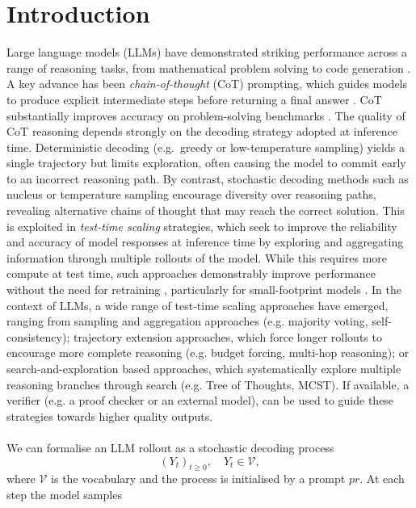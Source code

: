 \documentclass{article} %
\begin{document}
\section{Introduction}\label{sec:introduction}
Large language models (LLMs) have demonstrated striking performance across a range of reasoning tasks, from mathematical problem solving to code generation \citep{brown2020gpt3,openai2023gpt4}. 
A key advance has been \emph{chain-of-thought} (CoT) prompting, which guides models to produce explicit intermediate steps before returning a final answer \citep{wei2022cot,kojima2022zeroshot}. 
CoT substantially improves accuracy on problem-solving benchmarks \citep{cobbe2021gsm8k,lewkowycz2022minerva}. 
The quality of CoT reasoning depends strongly on the {decoding strategy} adopted at inference time.  Deterministic decoding (e.g.\ greedy or low-temperature sampling) yields a single trajectory but limits exploration, often causing the model to commit early to an incorrect reasoning path.    By contrast, stochastic decoding methods such as nucleus or temperature sampling encourage diversity over reasoning paths, revealing alternative chains of thought that may reach the correct solution.  This is exploited in \emph{test-time scaling} strategies, which seek to improve the reliability and accuracy of model responses at inference time by exploring and aggregating information through multiple rollouts of the model.   While this requires more compute at test time, such approaches demonstrably improve performance without the need for retraining \citep{yao2023treeofthoughts,besta2024graphofthoughts}, particularly for small-footprint models \citep{chan2025lean}.   In the context of LLMs, a wide range of test-time scaling approaches have emerged, ranging from sampling and aggregation approaches (e.g. majority voting, self-consistency); trajectory extension approaches,
which force longer rollouts to encourage more complete reasoning (e.g. budget forcing, multi-hop reasoning); or search-and-exploration based approaches, which systematically explore multiple reasoning branches through search (e.g. Tree of Thoughts, MCST). If available, a verifier (e.g. a proof checker or an external model), can be used to guide these strategies towards higher quality outputs.
\\\\
We can formalise an LLM rollout as a stochastic decoding process
\[
(Y_t)_{t \ge 0}, \quad Y_t \in \mathcal{V},
\]
where $\mathcal{V}$ is the vocabulary and the process is initialised by a prompt $pr$. 
At each step the model samples
\end{document}

